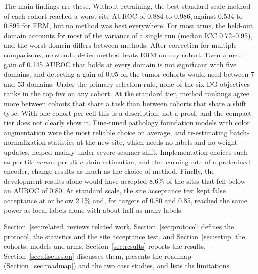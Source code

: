 The main findings are these. Without retraining, the best standard-scale
method of each cohort reached a worst-site AUROC of 0.884 to 0.986, against
0.534 to 0.895 for ERM, but no method was best everywhere. For most arms, the held-out domain accounts for
most of the variance of a single run (median ICC 0.72--0.95), and the worst
domain differs between methods. After correction for multiple comparisons, no
standard-tier method beats ERM on any cohort. Even a mean gain of 0.145 AUROC
that holds at every domain is not significant with five domains, and detecting
a gain of 0.05 on the tumor cohorts would need between 7 and 53 domains. Under
the primary selection rule, none of the six DG objectives ranks in the top five
on any cohort. At the standard
tier, method rankings agree more between cohorts that share a task than
between cohorts that share a shift type. With one cohort per cell this is a
description, not a proof, and the compact tier does not clearly show it. Fine-tuned
pathology foundation models with color augmentation were the most reliable
choice on average, and re-estimating batch-normalization statistics at the new
site, which needs no labels and no weight updates, helped mainly under severe
scanner shift. Implementation choices such as per-tile versus per-slide
stain estimation, and the learning rate of a pretrained encoder, change
results as much as the choice of method. Finally, the development results
alone would have accepted 8.6\% of the sites that fell below an AUROC of 0.80.
At standard scale, the site acceptance test kept false acceptance at or below
2.1\% and, for targets of 0.80 and 0.85, reached the same power as local labels
alone with about half as many labels.

Section~\ref{sec:related} reviews related work. Section~\ref{sec:protocol}
defines the protocol, the statistics and the site acceptance test, and
Section~\ref{sec:setup} the cohorts, models and arms. Section~\ref{sec:results} reports the results.
Section~\ref{sec:discussion} discusses them, presents the roadmap
(Section~\ref{sec:roadmap}) and the two case studies, and lists the
limitations.
